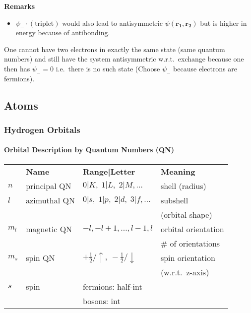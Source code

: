\newpar{}
\textbf{Remarks}
\begin{itemize}
    \item $\psi_{-}\cdot \left(\text{triplet}\right)$ would also lead to antisymmetric $\psi(\mathbf{r_1},\mathbf{r_2})$ but is higher in energy because of antibonding.
\end{itemize}

\newpar{}

One cannot have two electrons in exactly the same state (same quantum numbers) and still have the system antisymmetric w.r.t.\ exchange because one then has $\psi_{-}=0$ i.e.\ there is no such state (Choose $\psi_{-}$ because electrons are fermions).

\subsection{Atoms}
\subsubsection{Hydrogen Orbitals}
\paragraph{Orbital Description by Quantum Numbers (QN)}
\renewcommand{\arraystretch}{1.1}
\setlength{\oldtabcolsep}{\tabcolsep}\setlength\tabcolsep{2pt}
{\small     %
    \begin{tabularx}{\linewidth}{@{}lllX@{}}
              & \textbf{Name} & \textbf{Range|Letter}                             & \textbf{Meaning}    \\
        $n$   & principal QN  & $0|K,\;1|L,\;2|M,\dots$                           & shell (radius)      \\
        $l$   & azimuthal QN  & $0|s,\;1|p,\;2|d,\;3|f,\dots$                     & subshell            \\
              &               &                                                   & (orbital shape)     \\
        $m_l$ & magnetic QN   & $-l,-l+1,\dots,l-1,l$                             & orbital orientation \\
              &               &                                                   & \# of orientations  \\
        $m_s$ & spin QN       & $+\frac{1}{2}/\uparrow,\:-\frac{1}{2}/\downarrow$ & spin orientation    \\
              &               &                                                   & (w.r.t.\ z-axis)    \\
        $s$   & spin          & fermions: half-int                                &                     \\
              &               & bosons: int                                       &
    \end{tabularx}
}           %
\renewcommand{\arraystretch}{1}
\setlength{\tabcolsep}{\oldtabcolsep}

